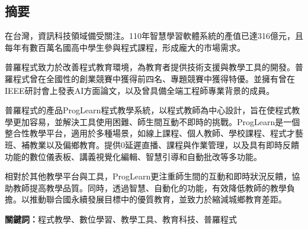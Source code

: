 \begin{center}
  \section*{摘要}
\end{center}

在台灣，資訊科技領域備受關注。110年智慧學習軟體系統的產值已達316億元，且每年有數百萬名國高中學生參與程式課程，形成龐大的市場需求。

普羅程式致力於改善程式教育環境，為教育者提供技術支援與教學工具的開發。普羅程式曾在全國性的創業競賽中獲得前四名、專題競賽中獲得特優。並擁有曾在IEEE研討會上發表AI方面論文，以及曾具備全端工程師專業背景的成員。

普羅程式的產品ProgLearn程式教學系統，以程式教師為中心設計，旨在使程式教學更加容易，並解決工具使用困難、師生間互動不即時的挑戰。ProgLearn是一個整合性教學平台，適用於多種場景，如線上課程、個人教師、學校課程、程式才藝班、補教業以及偏鄉教育。提供0延遲直播、課程與作業管理，以及具有即時反饋功能的數位儀表板、講義視覺化編輯、智慧引導和自動批改等多功能。

相對於其他教學平台與工具，ProgLearn更注重師生間的互動和即時狀況反饋，協助教師提高教學品質。同時，透過智慧、自動化的功能，有效降低教師的教學負擔。以推動聯合國永續發展目標中的優質教育，並致力於縮減城鄉教育差距。
\\ \par \noindent
\textbf{關鍵詞：}程式教學、數位學習、教學工具、教育科技、普羅程式